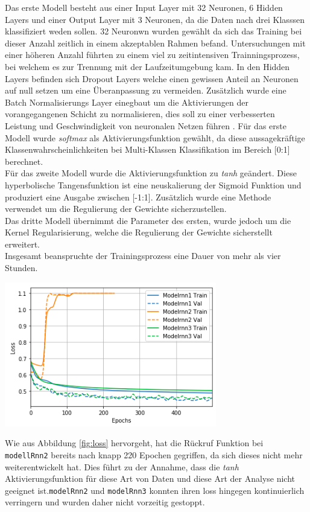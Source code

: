 \documentclass[
    12pt, %
    DIV10,
    ngerman, %
    a4paper, %
    oneside, %
    titlepage, %
    parskip=half, %
    headings=normal, %
    listof=totoc, %
    bibliography=totoc, %
    index=totoc, %
    captions=tableheading, %
    final %
]{scrreprt}
\begin{document}
Das erste Modell besteht aus einer Input Layer mit 32 Neuronen, 6 Hidden Layers und einer Output Layer mit 3 Neuronen, da die Daten nach drei Klasssen klassifiziert weden sollen. 32 Neuronwn wurden gewählt da sich das Training bei dieser Anzahl zeitlich in einem akzeptablen Rahmen befand. Untersuchungen mit einer höheren Anzahl führten zu einem viel zu zeitintensiven Trainningsprozess, bei welchem es zur Trennung mit der Laufzeitumgebung kam. In den Hidden Layers befinden sich Dropout Layers welche einen gewissen Anteil an Neuronen auf null setzen um eine Überanpassung zu vermeiden. Zusätzlich wurde eine Batch Normalisierungs Layer einegbaut um die Aktivierungen der vorangegangenen Schicht zu normalisieren, dies soll zu einer verbesserten Leistung und Geschwindigkeit von neuronalen Netzen führen \parencite{Ioffe}. Für das erste Modell wurde \emph{softmax} als Aktivierungsfunktion gewählt, da diese aussagekräftige Klassenwahrscheinlichkeiten bei Multi-Klassen Klassifikation im Bereich [0:1] berechnet.\\
Für das zweite Modell wurde die Aktivierungsfunktion zu \emph{tanh} geändert. Diese hyperbolische Tangensfunktion ist eine neuskalierung der Sigmoid Funktion und produziert eine Ausgabe zwischen [-1:1]. Zusätzlich wurde eine Methode verwendet um die Regulierung der Gewichte sicherzustellen.\\
Das dritte Modell übernimmt die Parameter des ersten, wurde jedoch um die Kernel Regularisierung, welche die Regulierung der Gewichte sicherstellt erweitert.\\
Insgesamt beanspruchte der Trainingsprozess eine Dauer von mehr als vier Stunden.
\begin{center}
\includegraphics[scale=0.7]{img/lossAll.png}
\label{fig:loss}
\end{center}
Wie aus Abbildung \ref{fig:loss} hervorgeht, hat die Rückruf Funktion bei \texttt{modellRnn2} bereits nach knapp 220 Epochen gegriffen, da sich dieses nicht mehr weiterentwickelt hat. Dies führt zu der Annahme, dass die \emph{tanh} Aktivierungsfunktion für diese Art von Daten und diese Art der Analyse nicht geeignet ist.\texttt{modelRnn2} und \texttt{modelRnn3} konnten ihren loss hingegen kontinuierlich verringern und wurden daher nicht vorzeitig gestoppt.
\end{document}
